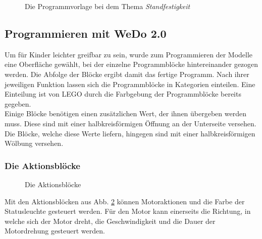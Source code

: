 \begin{figure}[htbp!]
	\centering
	\caption[Die Programmvorlage]{Die Programmvorlage bei dem Thema \textit{Standfestigkeit}}
	\label{img:programtemplate}
\end{figure} 

\subsection{Programmieren mit WeDo 2.0}\label{WedoSoftware}
Um für Kinder leichter greifbar zu sein, wurde zum Programmieren der Modelle eine Oberfläche gewählt, bei der einzelne Programmblöcke hintereinander gezogen werden. Die Abfolge der Blöcke ergibt damit das fertige Programm. Nach ihrer jeweiligen Funktion lassen sich die Programmblöcke in Kategorien einteilen. Eine Einteilung ist von LEGO durch die Farbgebung der Programmblöcke bereits gegeben. \\
Einige Blöcke benötigen einen zusätzlichen Wert, der ihnen übergeben werden muss. Diese sind mit einer halbkreisförmigen Öffnung an der Unterseite versehen. Die Blöcke, welche diese Werte liefern, hingegen sind mit einer halbkreisförmigen Wölbung versehen. 

\subsubsection{Die Aktionsblöcke}
\begin{figure}[htbp!]
	\centering
	\caption[Die Aktionsblöcke]{Die Aktionsblöcke} %
	\label{img:Aktionsblöcke}
\end{figure}

Mit den Aktionsblöcken aus Abb. \ref{img:Aktionsblöcke} können Motoraktionen und die Farbe der Statusleuchte gesteuert werden. Für den Motor kann einerseits die Richtung, in welche sich der Motor dreht, die Geschwindigkeit und die Dauer der Motordrehung gesteuert werden.

